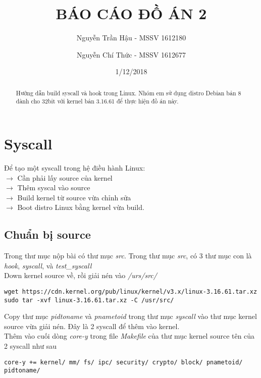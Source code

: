 \documentclass[12pt]{article}
\begin{document}
\title{BÁO CÁO ĐỒ ÁN 2}
\author{Nguyễn Trần Hậu - MSSV 1612180
\and Nguyễn Chí Thức - MSSV 1612677}
\date{1/12/2018}
\maketitle

\begin{abstract}
Hướng dẫn build syscall và hook trong Linux.
Nhóm em sử dụng distro Debian bản 8 dành cho 32bit với kernel bản 3.16.61 để thực hiện đồ án này.
\end{abstract}



\section{Syscall}
Để tạo một syscall trong hệ điều hành Linux: \\
$\rightarrow$ Cần phải lấy source của kernel \\
$\rightarrow$ Thêm syscal vào source \\
$\rightarrow$ Build kernel từ source vừa chỉnh sửa \\
$\rightarrow$ Boot distro Linux bằng kernel vừa build. \\

\subsection{Chuẩn bị source}

Trong thư mục nộp bài có thư mục \textit{src}.
Trong thư mục \textit{src}, có 3 thư mục con là \textit{hook}, \textit{syscall}, và \textit{test\_syscall} \\

Down kernel source về, rồi giải nén vào \textit{/urs/src/}
\begin{lstlisting}
wget https://cdn.kernel.org/pub/linux/kernel/v3.x/linux-3.16.61.tar.xz
sudo tar -xvf linux-3.16.61.tar.xz -C /usr/src/
\end{lstlisting}

Copy thư mục \textit{pidtoname} và \textit{pnametoid} trong thư mục \textit{syscall} vào thư mục kernel source vừa giải nén.
Đây là 2 syscall để thêm vào kernel. \\


Thêm vào cuối dòng \textit{core-y} trong file \textit{Makefile} của thư mục kernel source tên của 2 syscall như sau
\begin{lstlisting}
core-y += kernel/ mm/ fs/ ipc/ security/ crypto/ block/ pnametoid/ pidtoname/
\end{lstlisting}
\end{document}
